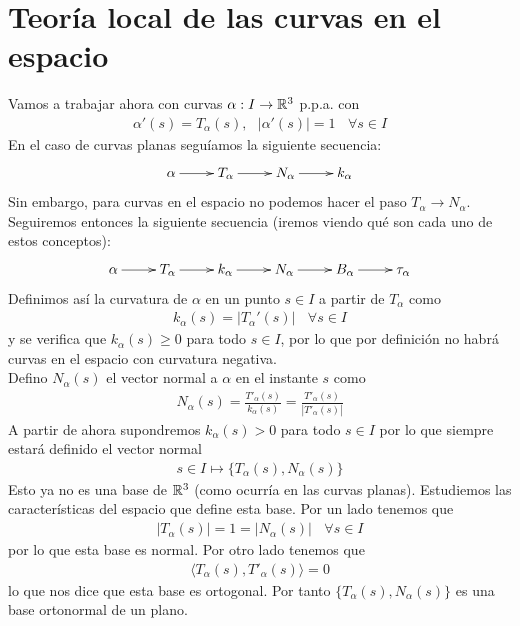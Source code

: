\chapter{Teoría local de las curvas en el espacio}

Vamos a trabajar ahora con curvas $\alpha: I \to \mathbb{R}^3$ p.p.a. con
\begin{gather*}
    \alpha'(s) = T_\alpha(s),\ \ \ |\alpha'(s)| = 1\ \ \ \ \forall s \in I
\end{gather*}
En el caso de curvas planas seguíamos la siguiente secuencia:
\begin{gather*}
    \xymatrix{
        \alpha \ar[r] & T_\alpha \ar[r] & N_\alpha \ar[r] & k_\alpha
    }
\end{gather*}
Sin embargo, para curvas en el espacio no podemos hacer el paso $T_\alpha \to N_\alpha$. Seguiremos entonces la siguiente secuencia (iremos viendo qué son cada uno de estos conceptos):
\begin{gather*}
    \xymatrix{
        \alpha \ar[r] & T_\alpha \ar[r] & k_\alpha \ar[r] & N_\alpha \ar[r] & B_\alpha \ar[r] & \tau_\alpha
    }
\end{gather*}
Definimos así la curvatura de $\alpha$ en un punto $s\in I$ a partir de $T_\alpha$ como
\begin{gather*}
    k_\alpha(s) = |T_\alpha'(s)| \ \ \ \ \forall s \in I
\end{gather*} 
y se verifica que $k_\alpha(s) \geq 0$ para todo $s\in I$, por lo que por definición no habrá curvas en el espacio con curvatura negativa.\\

Defino $N_\alpha(s)$ el vector normal a $\alpha$ en el instante $s$ como 
\begin{gather*}
    N_\alpha(s) = \frac{T'_\alpha(s)}{k_\alpha(s)} = \frac{T'_\alpha(s)}{|T'_\alpha(s)|}
\end{gather*}
A partir de ahora supondremos $k_\alpha(s)>0$ para todo $s\in I$ por lo que siempre estará definido el vector normal 
\begin{gather*}
    s\in I \mapsto \{T_\alpha(s), N_\alpha(s)\}
\end{gather*}
Esto ya no es una base de $\mathbb{R}^3$ (como ocurría en las curvas planas). Estudiemos las características del espacio que define esta base. Por un lado tenemos que 
\begin{gather*}
    |T_\alpha(s)| = 1 = |N_\alpha(s)|\ \ \ \ \forall s \in I
\end{gather*}
por lo que esta base es normal. Por otro lado tenemos que 
\begin{gather*}
    \langle T_\alpha(s), T'_\alpha(s)\rangle = 0
\end{gather*}
lo que nos dice que esta base es ortogonal. Por tanto $\{T_\alpha(s), N_\alpha(s)\}$ es una base ortonormal de un plano. \\


